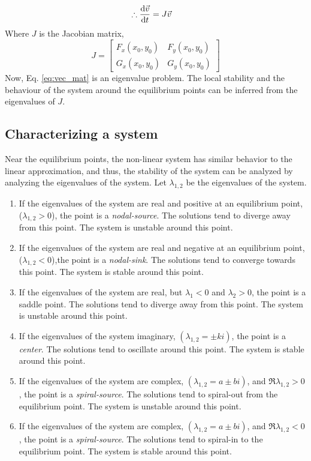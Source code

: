 \documentclass[12pt,1in]{article}
\begin{document}
\begin{align}
    \therefore \derivative{\Vec{v}}{t} &= J\Vec{v} \label{eq:vec_mat}
\end{align}
Where $J$ is the Jacobian matrix, $$J = \begin{bmatrix}
    F_x(x_0, y_0) & F_y(x_0, y_0)\\
    G_x(x_0, y_0) & G_y(x_0, y_0)
    \end{bmatrix}$$
Now, Eq. \ref{eq:vec_mat} is an eigenvalue problem. The local stability and the behaviour of the system around the equilibrium points can be inferred from the eigenvalues of $J$. 

\subsection{Characterizing a system}
Near the equilibrium points, the non-linear system has similar behavior to the linear approximation, and thus, the stability of the system can be analyzed by analyzing the eigenvalues of the system. Let $\lambda_{1,2}$ be the eigenvalues of the system.
\begin{enumerate}
	\item If the eigenvalues of the system are real and positive at an equilibrium point, ($\lambda_{1,2} > 0$), the point is a \emph{nodal-source}. The solutions tend to diverge away from this point. The system is unstable around this point. 
	\item If the eigenvalues of the system are real and negative at an equilibrium point, ($\lambda_{1,2} < 0$),the point is a \emph{nodal-sink}. The solutions tend to converge towards this point. The system is stable around this point. 
	\item If the eigenvalues of the system are real, but $\lambda_1 < 0$ and $\lambda_2 > 0$, the point is a saddle point. The solutions tend to diverge away from this point. The system is unstable around this point.
	\item If the eigenvalues of the system imaginary, $(\lambda_{1,2} = \pm k i)$, the point is a \emph{center}.  The solutions tend to oscillate around this point. The system is stable around this point.
	\item If the eigenvalues of the system are complex, $(\lambda_{1,2} = a \pm b i)$, and $\Re{\lambda_{1,2}}> 0$, the point is a \emph{spiral-source}. The solutions tend to spiral-out from the equilibrium point. The system is unstable around this point.
	\item If the eigenvalues of the system are complex, $(\lambda_{1,2} = a \pm b i)$, and $\Re{\lambda_{1,2}}< 0$, the point is a \emph{spiral-source}. The solutions tend to spiral-in to the equilibrium point. The system is stable around this point.
\end{enumerate}
\end{document}
